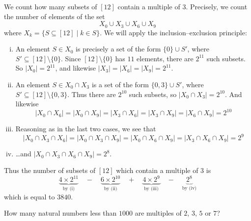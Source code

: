 \begin{example}
We count how many subsets of $[12]$ contain a multiple of $3$. Precisely, we count the number of elements of the set
\[ X_0 \cup X_3 \cup X_6 \cup X_9 \]
where $X_k = \{ S \subseteq [12] \mid k \in S \}$. We will apply the inclusion--exclusion principle:
\begin{enumerate}[(i)]
\item An element $S \in X_0$ is precisely a set of the form $\{ 0 \} \cup S'$, where $S' \subseteq [12] \setminus \{ 0 \}$. Since $[12] \setminus \{ 0 \}$ has $11$ elements, there are $2^{11}$ such subsets. So $|X_0| = 2^{11}$, and likewise $|X_3| = |X_6| = |X_9| = 2^{11}$.
\item An element $S \in X_0 \cap X_3$ is a set of the form $\{0,3\} \cup S'$, where $S' \subseteq [12] \setminus \{ 0, 3 \}$. Thus there are $2^{10}$ such subsets, so $|X_0 \cap X_3| = 2^{10}$. And likewise
\[ |X_0 \cap X_6| = |X_0 \cap X_9| = |X_3 \cap X_6| = |X_3 \cap X_9| = |X_6 \cap X_9| = 2^{10} \]
\item Reasoning as in the last two cases, we see that
\[ |X_0 \cap X_3 \cap X_6| = |X_0 \cap X_3 \cap X_9| = |X_0 \cap X_6 \cap X_9| = |X_3 \cap X_6 \cap X_9| = 2^9 \]
\item \dots{}and $|X_0 \cap X_3 \cap X_6 \cap X_9| = 2^8$.
\end{enumerate}
Thus the number of subsets of $[12]$ which contain a multiple of $3$ is
\[ \underbrace{4 \times 2^{11}}_{\text{by (i)}} \quad - \quad \underbrace{6 \times 2^{10}}_{\text{by (ii)}}  \quad + \quad \underbrace{4 \times 2^9}_{\text{by (iii)}} \quad - \quad \underbrace{2^8}_{\text{by (iv)}}  \]
which is equal to $3840$.
\end{example}

\begin{exercise}
How many natural numbers less than $1000$ are multiples of $2$, $3$, $5$ or $7$?
\end{exercise}


